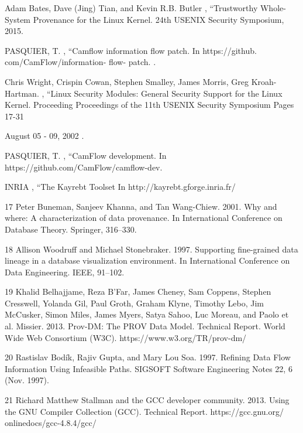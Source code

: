 \documentclass{IEEEtran}
\begin{document}
\begin{thebibliography}{00}
 Adam Bates, Dave (Jing) Tian, and Kevin R.B. Butler , ``Trustworthy Whole-System Provenance
for the Linux Kernel.
24th USENIX Security Symposium, 2015.








 PASQUIER, T. , ``Camflow information flow patch.
In https://github. com/CamFlow/information- flow- patch.
.


 	Chris Wright,	
Crispin Cowan,	
Stephen Smalley,	
James Morris,	
Greg Kroah-Hartman.	
, ``Linux Security Modules: General Security Support for the Linux Kernel.
Proceeding
Proceedings of the 11th USENIX Security Symposium
Pages 17-31 

August 05 - 09, 2002 .


 PASQUIER, T. , ``CamFlow development.
In https://github.com/CamFlow/camflow-dev.

 INRIA , ``The Kayrebt Toolset
In http://kayrebt.gforge.inria.fr/


17 Peter Buneman, Sanjeev Khanna, and Tan Wang-Chiew. 2001. Why and where:
A characterization of data provenance. In International Conference on Database
Theory. Springer, 316–330.


18 Allison Woodruff and Michael Stonebraker. 1997. Supporting fine-grained data
lineage in a database visualization environment. In International Conference on
Data Engineering. IEEE, 91–102.

19 Khalid Belhajjame, Reza B’Far, James Cheney, Sam Coppens, Stephen Cresswell,
Yolanda Gil, Paul Groth, Graham Klyne, Timothy Lebo, Jim McCusker, Simon
Miles, James Myers, Satya Sahoo, Luc Moreau, and Paolo et al. Missier. 2013.
Prov-DM: The PROV Data Model. Technical Report. World Wide Web Consortium
(W3C). https://www.w3.org/TR/prov-dm/

20  Rastislav Bodík, Rajiv Gupta, and Mary Lou Soa. 1997. Refining Data Flow
Information Using Infeasible Paths. SIGSOFT Software Engineering Notes 22, 6
(Nov. 1997).

21 Richard Matthew Stallman and the GCC developer community. 2013. Using
the GNU Compiler Collection (GCC). Technical Report. https://gcc.gnu.org/
onlinedocs/gcc-4.8.4/gcc/
\end{thebibliography}
\end{document}
